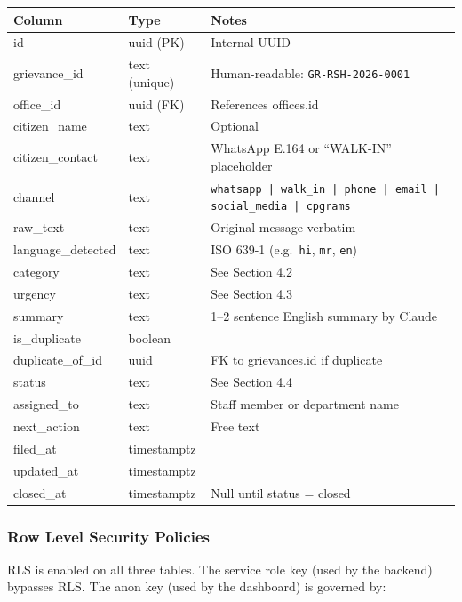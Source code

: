 \documentclass[11pt, a4paper]{article}
\begin{document}
\begin{tabularx}{\linewidth}{llX}
\toprule
\textbf{Column} & \textbf{Type} & \textbf{Notes} \\
\midrule
id                & uuid (PK)   & Internal UUID \\
grievance\_id     & text (unique) & Human-readable: \texttt{GR-RSH-2026-0001} \\
office\_id        & uuid (FK)   & References offices.id \\
citizen\_name     & text        & Optional \\
citizen\_contact  & text        & WhatsApp E.164 or ``WALK-IN'' placeholder \\
channel           & text        & \texttt{whatsapp | walk\_in | phone | email | social\_media | cpgrams} \\
raw\_text         & text        & Original message verbatim \\
language\_detected & text       & ISO 639-1 (e.g.\ \texttt{hi}, \texttt{mr}, \texttt{en}) \\
category          & text        & See Section 4.2 \\
urgency           & text        & See Section 4.3 \\
summary           & text        & 1--2 sentence English summary by Claude \\
is\_duplicate     & boolean     & \\
duplicate\_of\_id & uuid        & FK to grievances.id if duplicate \\
status            & text        & See Section 4.4 \\
assigned\_to      & text        & Staff member or department name \\
next\_action      & text        & Free text \\
filed\_at         & timestamptz & \\
updated\_at       & timestamptz & \\
closed\_at        & timestamptz & Null until status = closed \\
\bottomrule
\end{tabularx}

\subsubsection{Row Level Security Policies}

RLS is enabled on all three tables. The service role key (used by the backend) bypasses RLS. The anon key (used by the dashboard) is governed by:
\end{document}
